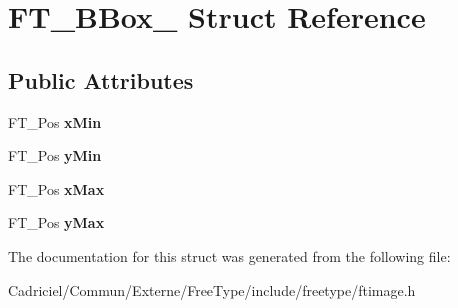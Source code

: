 \hypertarget{struct_f_t___b_box__}{}\section{F\+T\+\_\+\+B\+Box\+\_\+ Struct Reference}
\label{struct_f_t___b_box__}
\subsection*{Public Attributes}
\begin{DoxyCompactItemize}
\item 
F\+T\+\_\+\+Pos {\bfseries x\+Min}\hypertarget{struct_f_t___b_box___a1f2a5d0565d496c1d41e43d018f45add}{}\label{struct_f_t___b_box___a1f2a5d0565d496c1d41e43d018f45add}

\item 
F\+T\+\_\+\+Pos {\bfseries y\+Min}\hypertarget{struct_f_t___b_box___a959ca1d5bc1c5338da0d85c8e7135f4e}{}\label{struct_f_t___b_box___a959ca1d5bc1c5338da0d85c8e7135f4e}

\item 
F\+T\+\_\+\+Pos {\bfseries x\+Max}\hypertarget{struct_f_t___b_box___ac6da5c44f4cb7b97eef1f438eb69c0ec}{}\label{struct_f_t___b_box___ac6da5c44f4cb7b97eef1f438eb69c0ec}

\item 
F\+T\+\_\+\+Pos {\bfseries y\+Max}\hypertarget{struct_f_t___b_box___a77084921589f386a8a593ae1f25b1569}{}\label{struct_f_t___b_box___a77084921589f386a8a593ae1f25b1569}

\end{DoxyCompactItemize}


The documentation for this struct was generated from the following file\+:\begin{DoxyCompactItemize}
\item 
Cadriciel/\+Commun/\+Externe/\+Free\+Type/include/freetype/ftimage.\+h\end{DoxyCompactItemize}

